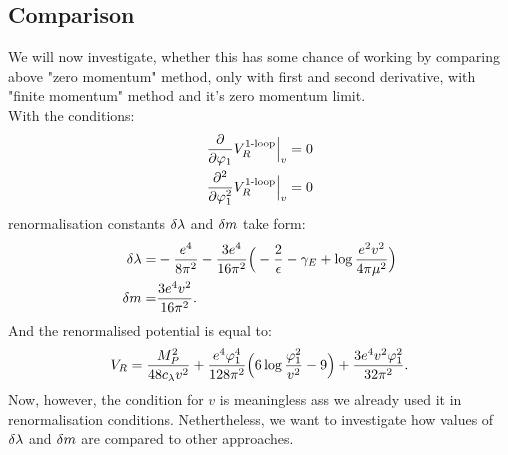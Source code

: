 \subsection{Comparison}
We will now investigate, whether this has some chance of working by comparing 
above "zero momentum" method, only with first and second derivative, with "finite momentum" 
method and it's zero momentum limit. \\
With the conditions:
\begin{align}
\frac{\partial }{\partial \varphi_1}V_R^{\textrm{1-loop}}\Big|_{v} &= 0 \\
\frac{\partial^2 }{\partial \varphi_1^2}V_R^{\textrm{1-loop}}\Big|_{v} &= 0
\end{align}
renormalisation constants $\delta\lambda$ and $\delta m$ take form:
\begin{align}
\delta\lambda =& -\frac{e^4}{8\pi^2}-\frac{3e^4}{16\pi^2}\Big(-\frac{2}{\epsilon}-\gamma_E+\log{
\frac{e^2v^2}{4\pi\mu^2}}\Big)\\
\delta m =& \frac{3e^4v^2}{16\pi^2}.
\end{align}
And the renormalised potential is equal to:
\begin{align}
V_R = \frac{M_P^2}{48c_\lambda v^2}+\frac{e^4\varphi_1^4}{128\pi^2}\Big(6\log{
\frac{\varphi_1^2}{v^2}} - 9\Big)+\frac{3e^4v^2\varphi_1^2}{32\pi^2}.
\end{align}
Now, however, the condition for $v$ is meaningless ass we already used it in renormalisation 
conditions. Nethertheless, we want to investigate how values of $\delta\lambda$ and $\delta m$ are compared 
to other approaches.
